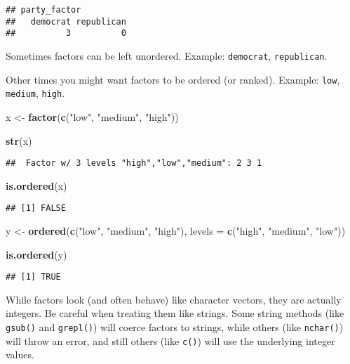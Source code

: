 \documentclass[
]{book}
\newenvironment{Shaded}{\begin{snugshade}}{\end{snugshade}}
\newcommand{\DataTypeTok}[1]{\textcolor[rgb]{0.13,0.29,0.53}{#1}}
\newcommand{\KeywordTok}[1]{\textcolor[rgb]{0.13,0.29,0.53}{\textbf{#1}}}
\newcommand{\NormalTok}[1]{#1}
\newcommand{\StringTok}[1]{\textcolor[rgb]{0.31,0.60,0.02}{#1}}
\begin{document}
\begin{verbatim}
## party_factor
##   democrat republican 
##          3          0
\end{verbatim}

Sometimes factors can be left unordered. Example: \texttt{democrat}, \texttt{republican}.

Other times you might want factors to be ordered (or ranked). Example: \texttt{low}, \texttt{medium}, \texttt{high}.

\begin{Shaded}
\begin{Highlighting}[]
\NormalTok{x \textless{}{-}}\StringTok{ }\KeywordTok{factor}\NormalTok{(}\KeywordTok{c}\NormalTok{(}\StringTok{"low"}\NormalTok{, }\StringTok{"medium"}\NormalTok{, }\StringTok{"high"}\NormalTok{))}

\KeywordTok{str}\NormalTok{(x)}
\end{Highlighting}
\end{Shaded}

\begin{verbatim}
##  Factor w/ 3 levels "high","low","medium": 2 3 1
\end{verbatim}

\begin{Shaded}
\begin{Highlighting}[]
\KeywordTok{is.ordered}\NormalTok{(x)}
\end{Highlighting}
\end{Shaded}

\begin{verbatim}
## [1] FALSE
\end{verbatim}

\begin{Shaded}
\begin{Highlighting}[]
\NormalTok{y \textless{}{-}}\StringTok{ }\KeywordTok{ordered}\NormalTok{(}\KeywordTok{c}\NormalTok{(}\StringTok{"low"}\NormalTok{, }\StringTok{"medium"}\NormalTok{, }\StringTok{"high"}\NormalTok{), }\DataTypeTok{levels =} \KeywordTok{c}\NormalTok{(}\StringTok{"high"}\NormalTok{, }\StringTok{"medium"}\NormalTok{, }\StringTok{"low"}\NormalTok{))}

\KeywordTok{is.ordered}\NormalTok{(y)}
\end{Highlighting}
\end{Shaded}

\begin{verbatim}
## [1] TRUE
\end{verbatim}

While factors look (and often behave) like character vectors, they are actually integers. Be careful when treating them like strings. Some string methods (like \texttt{gsub()} and \texttt{grepl()}) will coerce factors to strings, while others (like \texttt{nchar()}) will throw an error, and still others (like \texttt{c()}) will use the underlying integer values.
\end{document}
